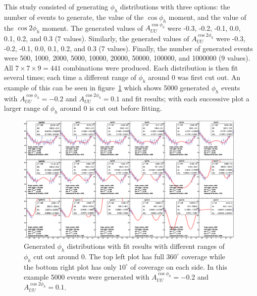 This study consisted of generating $\phi_h$ distributions with three options: the number of events to generate, the value of the $\cos\phi_h$ moment, and the value of the $\cos 2\phi_h$ moment.
The generated values of $A_{UU}^{\cos\phi_h}$ were -0.3, -0.2, -0.1, 0.0, 0.1, 0.2, and 0.3 (7 values).
Similarly, the generated values of $A_{UU}^{\cos 2\phi_h}$ were -0.3, -0.2, -0.1, 0.0, 0.1, 0.2, and 0.3 (7 values).
Finally, the number of generated events were 500, 1000, 2000, 5000, 10000, 20000, 50000, 100000, and 1000000 (9 values).
All $7 \times 7 \times 9 = 441$ combinations were produced.
Each distribution is then fit several times; each time a different range of $\phi_h$ around $0$ was first cut out.
An example of this can be seen in figure~\ref{fig:holeWidthStudyExample} which shows 5000 generated $\phi_h$ events with $A_{UU}^{\cos\phi_h} = -0.2$ and $A_{UU}^{\cos 2\phi_h} = 0.1$ and fit results; with each successive plot a larger range of $\phi_h$ around $0$ is cut out before fitting.
%
\begin{figure}
\centering
\includegraphics[width=8.5in]{figures/holeWidthStudyExample.png}
\caption{Generated $\phi_h$ distributions with fit results with different ranges of $\phi_h$ cut out around $0$. The top left plot has full $360^\circ$ coverage while the bottom right plot has only $10^\circ$ of coverage on each side. In this example 5000 events were generated with $A_{UU}^{\cos\phi_h} = -0.2$ and $A_{UU}^{\cos 2\phi_h} = 0.1$.}
\label{fig:holeWidthStudyExample}
\end{figure}


